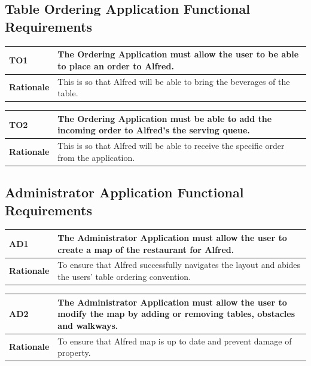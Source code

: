 \documentclass [11pt]{article}
\begin{document}
\subsection{Table Ordering Application Functional Requirements}

\begin{longtable}{| p{ } | p{ } | }\hline 
\rowcolor{tableCell}\textbf{TO1} & The Ordering Application must allow the user to be able to place an order to Alfred. \\ \hline
\textbf{Rationale} &  This is so that Alfred will be able to bring the beverages of the table.\\ \hline 
\end{longtable}

\begin{longtable}{| p{ } | p{ } | }\hline 
\rowcolor{tableCell}\textbf{TO2} & The Ordering Application must be able to add the incoming order to Alfred's  the serving queue. \\ \hline
\textbf{Rationale} &  This is so that Alfred will be able to receive the specific order from the application.\\ \hline 
\end{longtable}

\subsection{Administrator Application Functional Requirements}

\begin{longtable}{| p{ } | p{ } | }\hline 
\rowcolor{tableCell}\textbf{AD1} & The Administrator Application must allow the user to create a map of the restaurant for Alfred. \\ \hline
\textbf{Rationale} &  To ensure that Alfred successfully navigates the layout and abides the users' table ordering convention.\\ \hline 
\end{longtable}

\begin{longtable}{| p{ } | p{ } | }\hline 
\rowcolor{tableCell}\textbf{AD2} & The Administrator Application must allow the user to modify the map by adding or removing tables, obstacles and walkways.\\ \hline
\textbf{Rationale} &  To ensure that Alfred map is up to date and prevent damage of property.\\ \hline 
\end{longtable}
\end{document}
